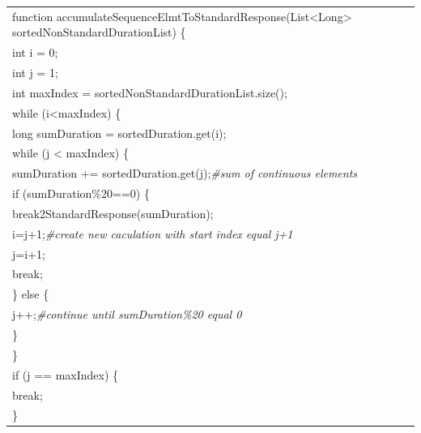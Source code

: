 \documentclass[a4paper, 13pt]{report}
\begin{document}
\begin{enumerate}[label=\textbf{PL\arabic*}]
\begin{flushleft}
\begin{tabular}{ |l| }
\hline
function accumulateSequenceElmtToStandardResponse(List<Long> sortedNonStandardDurationList) \{\\
\hspace{0.5cm} int i = 0;\\
\hspace{0.5cm} int j = 1;\\
\hspace{0.5cm} int maxIndex = sortedNonStandardDurationList.size();\\
\hspace{0.5cm} while (i<maxIndex) \{\\
\hspace{1cm}      long sumDuration = sortedDuration.get(i);\\
\hspace{1cm}      while (j < maxIndex) \{\\
\hspace{1.5cm}       sumDuration += sortedDuration.get(j);\textit{\#sum of continuous elements}\\
\hspace{1.5cm}       if (sumDuration\%20==0) \{\\
\hspace{2cm}           break2StandardResponse(sumDuration);\\
\hspace{2cm}           i=j+1;\textit{\#create new caculation with start index equal j+1}\\
\hspace{2cm}           j=i+1;\\
\hspace{2cm}           break;\\
\hspace{1.5cm}       \} else \{\\
\hspace{2cm}           j++;\textit{\#continue until sumDuration\%20 equal 0}\\
\hspace{1.5cm}        \}\\
\hspace{1cm}       \}\\
\hspace{1cm}     if (j == maxIndex) \{\\
\hspace{1.5cm}        break;\\
\hspace{1cm}     \}\\

\end{tabular}
\end{flushleft}
\end{enumerate}
\end{document}
